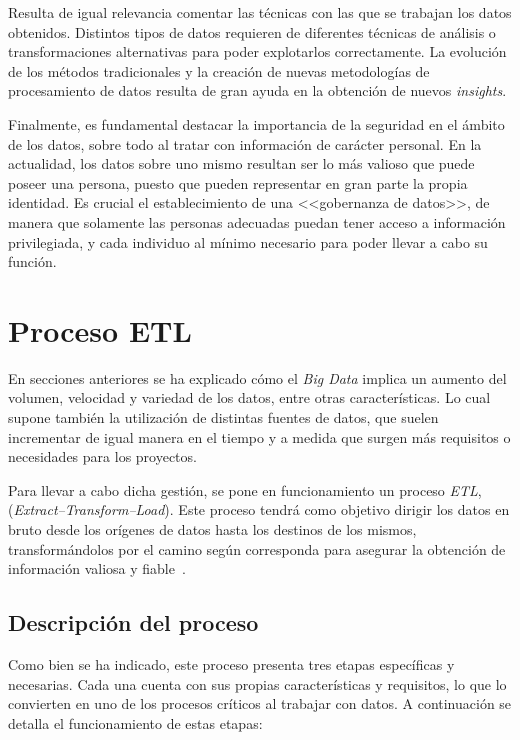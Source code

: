 Resulta de igual relevancia comentar las técnicas con las que se trabajan los datos obtenidos. Distintos tipos de datos requieren de diferentes técnicas de análisis o transformaciones alternativas para poder explotarlos correctamente. La evolución de los métodos tradicionales y la creación de nuevas metodologías de procesamiento de datos resulta de gran ayuda en la obtención de nuevos \textit{insights}.

Finalmente, es fundamental destacar la importancia de la seguridad en el ámbito de los datos, sobre todo al tratar con información de carácter personal. En la actualidad, los datos sobre uno mismo resultan ser lo más valioso que puede poseer una persona, puesto que pueden representar en gran parte la propia identidad. Es crucial el establecimiento de una <<gobernanza de datos>>, de manera que solamente las personas adecuadas puedan tener acceso a información privilegiada, y cada individuo al mínimo necesario para poder llevar a cabo su función.

\section{Proceso ETL}

En secciones anteriores se ha explicado cómo el \textit{Big Data} implica un aumento del volumen, velocidad y variedad de los datos, entre otras características. Lo cual supone también la utilización de distintas fuentes de datos, que suelen incrementar de igual manera en el tiempo y a medida que surgen más requisitos o necesidades para los proyectos.

Para llevar a cabo dicha gestión, se pone en funcionamiento un proceso \textit{ETL}, (\textit{Extract--Transform--Load}). Este proceso tendrá como objetivo dirigir los datos en bruto desde los orígenes de datos hasta los destinos de los mismos, transformándolos por el camino según corresponda para asegurar la obtención de información valiosa y fiable~\cite{databricksETL}.

\subsection{Descripción del proceso}

Como bien se ha indicado, este proceso presenta tres etapas específicas y necesarias. Cada una cuenta con sus propias características y requisitos, lo que lo convierten en uno de los procesos críticos al trabajar con datos. A continuación se detalla el funcionamiento de estas etapas:

